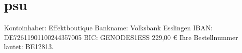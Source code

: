 
		\section{psu}

			Kontoinhaber: 	Effektboutique
			Bankname: 	Volksbank Esslingen
			IBAN: 	DE72611901100244357005
			BIC: 	GENODES1ESS
			229,00 €
			Ihre Bestellnummer lautet: BE12813.
